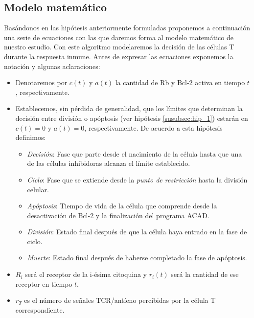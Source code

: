 \subsection{Modelo matemático}

Basándonos en las hipótesis anteriormente formuladas proponemos a continuación una serie de ecuaciones con las que daremos forma al modelo matemático de nuestro estudio. Con este algoritmo modelaremos la decisión de las células T durante la respuesta inmune. 
Antes de expresar las ecuaciones exponemos la notación y algunas aclaraciones: 

\begin{itemize}
\item Denotaremos por \textit{$c(t)$} y \textit{$a(t)$} la cantidad de Rb y Bcl-2 activa en tiempo $t$, respectivamente.
\item Establecemos, sin pérdida de generalidad, que los límites que determinan la decisión entre división o apóptosis (ver hipótesis \ref{susubsec:hip_1}) estarán en $c(t)=0$ y $a(t)=0$, respectivamente. De acuerdo a esta hipótesis definimos: 
	\begin{itemize}
		\item \textit{Decisión}: Fase que parte desde el nacimiento de la célula hasta que una de las células inhibidoras alcanza el límite establecido.
		\item \textit{Ciclo}: Fase que se extiende desde la \textit{punto de restricción} hasta la división celular.
		\item \textit{Apóptosis}: Tiempo de vida de la célula que comprende desde la desactivación de Bcl-2 y la finalización del programa ACAD.
		\item \textit{División}: Estado final después de que la célula haya entrado en la fase de ciclo.
		\item \textit{Muerte}: Estado final después de haberse completado la fase de apóptosis.
	\end{itemize}
\item \textit{$R_{i}$} será el receptor de la i-ésima citoquina y \textit{$r_{i}(t)$} será la cantidad de ese receptor en tiempo $t$. 
\item $r_{T}$ es el número de señales TCR/antíeno  percibidas por la célula T correspondiente.
\end{itemize} 